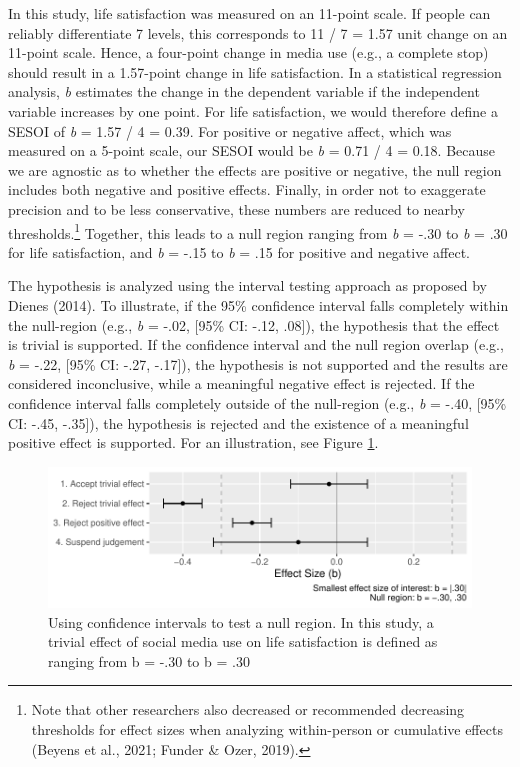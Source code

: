 \documentclass[
  man,mask,floatsintext]{apa7}
\begin{document}
In this study, life satisfaction was measured on an 11-point scale.
If people can reliably differentiate 7 levels, this corresponds to 11 / 7 = 1.57 unit change on an 11-point scale.
Hence, a four-point change in media use (e.g., a complete stop) should result in a 1.57-point change in life satisfaction.
In a statistical regression analysis, \emph{b} estimates the change in the dependent variable if the independent variable increases by one point.
For life satisfaction, we would therefore define a SESOI of \emph{b} = 1.57 / 4 = 0.39.
For positive or negative affect, which was measured on a 5-point scale, our SESOI would be \emph{b} = 0.71 / 4 = 0.18.
Because we are agnostic as to whether the effects are positive or negative, the null region includes both negative and positive effects.
Finally, in order not to exaggerate precision and to be less conservative, these numbers are reduced to nearby thresholds.\footnote{Note that other researchers also decreased or recommended decreasing thresholds for effect sizes when analyzing within-person or cumulative effects (Beyens et al., 2021; Funder \& Ozer, 2019).}
Together, this leads to a null region ranging from \emph{b} = -.30 to \emph{b} = .30 for life satisfaction, and \emph{b} = -.15 to \emph{b} = .15 for positive and negative affect.

The hypothesis is analyzed using the interval testing approach as proposed by Dienes (2014).
To illustrate, if the 95\% confidence interval falls completely within the null-region (e.g., \emph{b} = -.02, {[}95\% CI: -.12, .08{]}), the hypothesis that the effect is trivial is supported.
If the confidence interval and the null region overlap (e.g., \emph{b} = -.22, {[}95\% CI: -.27, -.17{]}), the hypothesis is not supported and the results are considered inconclusive, while a meaningful negative effect is rejected.
If the confidence interval falls completely outside of the null-region (e.g., \emph{b} = -.40, {[}95\% CI: -.45, -.35{]}), the hypothesis is rejected and the existence of a meaningful positive effect is supported.
For an illustration, see Figure \ref{fig:sesoi}.

\begin{figure}
\centering
\includegraphics{manuscript_files/figure-latex/sesoi-1.pdf}
\caption{\label{fig:sesoi}Using confidence intervals to test a null region. In this study, a trivial effect of social media use on life satisfaction is defined as ranging from b = -.30 to b = .30}
\end{figure}
\end{document}
